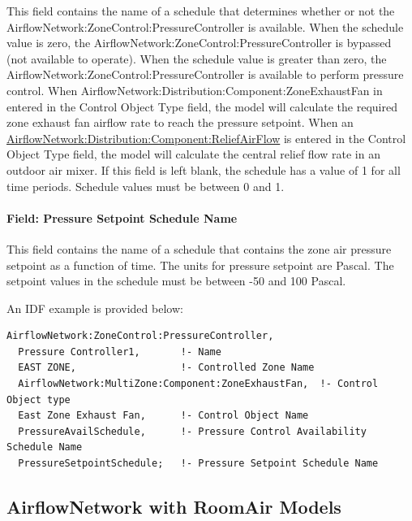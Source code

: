 This field contains the name of a schedule that determines whether or not the AirflowNetwork:ZoneControl:PressureController is available. When the schedule value is zero, the AirflowNetwork:ZoneControl:PressureController is bypassed (not available to operate). When the schedule value is greater than zero, the AirflowNetwork:ZoneControl:PressureController is available to perform pressure control. When AirflowNetwork:Distribution:Component:ZoneExhaustFan in entered in the Control Object Type field, the model will calculate the required zone exhaust fan airflow rate to reach the pressure setpoint. When an \hyperref[airflowNetworkdistributioncomponentreliefairflow]{AirflowNetwork:Distribution:Component:ReliefAirFlow} is entered in the Control Object Type field, the model will calculate the central relief flow rate in an outdoor air mixer. If this field is left blank, the schedule has a value of 1 for all time periods. Schedule values must be between 0 and 1.

\paragraph{ Field: Pressure Setpoint Schedule Name}\label{field-pressure-setpoint-schedule-name}

This field contains the name of a schedule that contains the zone air pressure setpoint as a function of time. The units for pressure setpoint are Pascal. The setpoint values in the schedule must be between -50 and 100 Pascal.

An IDF example is provided below:

\begin{lstlisting}
AirflowNetwork:ZoneControl:PressureController,
  Pressure Controller1,       !- Name
  EAST ZONE,                  !- Controlled Zone Name
  AirflowNetwork:MultiZone:Component:ZoneExhaustFan,  !- Control Object type
  East Zone Exhaust Fan,      !- Control Object Name
  PressureAvailSchedule,      !- Pressure Control Availability Schedule Name
  PressureSetpointSchedule;   !- Pressure Setpoint Schedule Name
\end{lstlisting}

\subsection{AirflowNetwork with RoomAir Models}\label{airflownetwork-roomair-models}

